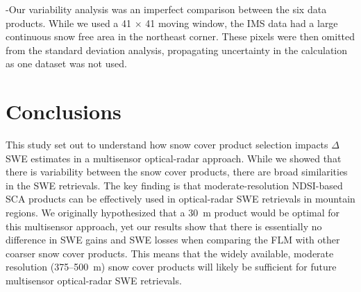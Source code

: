 -Our variability analysis was an imperfect comparison between the six data products. While we used a 41 $\times$ 41 moving window, the IMS data had a large continuous snow free area in the northeast corner. These pixels were then omitted from the standard deviation analysis, propagating uncertainty in the calculation as one dataset was not used.


\hypertarget{ch6-conclusions}{\section{Conclusions}\label{ch6-conclusions}}

This study set out to understand how snow cover product selection impacts $\Delta$SWE estimates in a multisensor optical-radar approach. While we showed that there is variability between the snow cover products, there are broad similarities in the SWE retrievals. The key finding is that moderate-resolution NDSI-based SCA products can be effectively used in optical-radar SWE retrievals in mountain regions. We originally hypothesized that a 30~m product would be optimal for this multisensor approach, yet our results show that there is essentially no difference in SWE gains and SWE losses when comparing the FLM with other coarser snow cover products. This means that the widely available, moderate resolution (375--500~m) snow cover products will likely be sufficient for future multisensor optical-radar SWE retrievals. 

\clearpage



